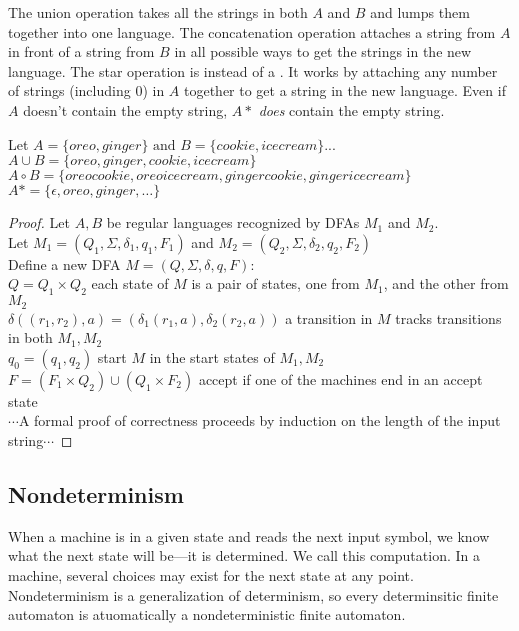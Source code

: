 \documentclass{article}
\begin{document}
The union operation takes all the strings in both $A$ and $B$ and lumps them together into one language. The concatenation operation attaches a string from $A$ in front of a string from $B$ in all possible ways to get the strings in the new language. The star operation is  instead of a . It works by attaching any number of strings (including 0) in $A$ together to get a string in the new language. Even if $A$ doesn't contain the empty string, $A*$ \emph{does} contain the empty string. 

\begin{example}
  Let $A = \{oreo,ginger\} \textrm{ and } B = \{cookie,icecream\}$... \\ 
  $A \cup B = \{oreo,ginger,cookie,icecream\}$ \\ 
  $A \circ B = \{oreocookie,oreoicecream,gingercookie,gingericecream\}$ \\ 
  $A* = \{\epsilon,oreo,ginger, \dots\}$ \\
\end{example}

\begin{proof}
   Let $A,B$ be regular languages recognized by DFAs $M_1$ and $M_2$. \\ 
  Let $M_1 = (Q_1, \Sigma, \delta_1, q_1, F_1)$ and $M_2 = (Q_2, \Sigma, \delta_2, q_2, F_2)$ \\ 
  Define a new DFA $M = (Q, \Sigma, \delta, q, F)$: \\ 
  $Q = Q_1 \times Q_2$ \hfill each state of $M$ is a pair of states, one from $M_1$, and the other from $M_2$ \\ 
  $\delta((r_1, r_2),a) = (\delta_1(r_1,a), \delta_2(r_2,a))$ \hfill a transition in $M$ tracks transitions in both $M_1 ,M_2$ \\
  $q_0 = (q_1, q_2)$ \hfill start $M$ in the start states of $M_1, M_2$ \\ 
  $F = (F_1 \times Q_2) \cup (Q_1 \times F_2)$ \hfill accept if one of the machines end in an accept state \\ 
  $\cdots$A formal proof of correctness proceeds by induction on the length of the input string$\cdots$
\end{proof}

\subsection{Nondeterminism}

When a machine is in a given state and reads the next input symbol, we know what the next state will be---it is determined. We call this  computation. In a  machine, several choices may exist for the next state at any point. Nondeterminism is a generalization of determinism, so every determinsitic finite automaton is atuomatically a nondeterministic finite automaton. \\ 
\end{document}
